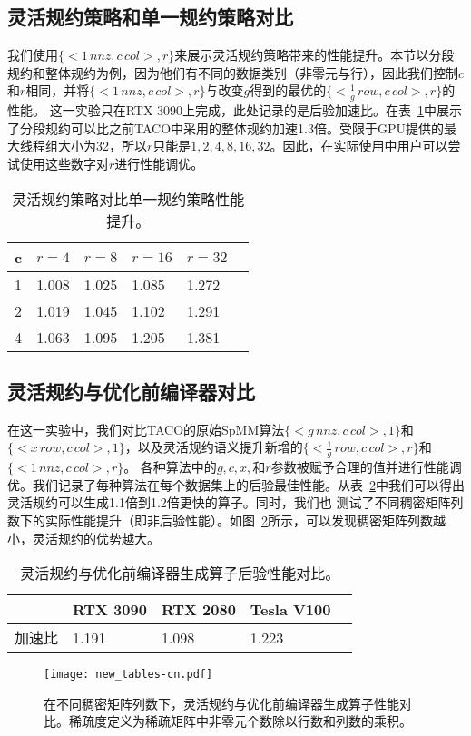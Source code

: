\subsection{灵活规约策略和单一规约策略对比}
我们使用$\{<1\,nnz , c\,col>,r\}$来展示灵活规约策略带来的性能提升。本节以分段规约和整体规约为例，因为他们有不同的数据类别（非零元与行），因此我们控制$c$和$r$相同，并将$\{<1\,nnz , c\,col>,r\}$与改变$g$得到的最优的$\{<\frac{1}{g}\,row, c\,col>,r\}$的性能。
这一实验只在RTX 3090上完成，此处记录的是后验加速比。在表~\ref{tab:comp-flexstr}中展示了分段规约可以比之前TACO中采用的整体规约加速1.3倍。受限于GPU提供的最大线程组大小为32，所以$r$只能是$1,2,4,8,16,32$。因此，在实际使用中用户可以尝试使用这些数字对$r$进行性能调优。
\begin{table}
  \centering
  \caption{灵活规约策略对比单一规约策略性能提升。}
  \begin{tabular}{llllll}
  \toprule
  c &  $r=4$  & $r=8$ & $r=16$  & $r=32$\\
  \midrule
  1   & 1.008   & 1.025  & 1.085 & 1.272 \\
  2    & 1.019   & 1.045  & 1.102 & 1.291 \\
  4   & 1.063   & 1.095  & 1.205 & 1.381 \\
  \bottomrule
  \end{tabular}
  \label{tab:comp-flexstr}
\end{table}
\subsection{灵活规约与优化前编译器对比}
在这一实验中，我们对比TACO的原始SpMM算法$\{<g\,nnz, c\,col>,1\}$和$\{<x\,row,c\,col >,1\}$，以及灵活规约语义提升新增的$\{<\frac{1}{g}\,row, c\,col>,r\}$和$\{<1\,nnz , c\,col>,r\}$。
各种算法中的$g,c,x,$和$r$参数被赋予合理的值并进行性能调优。我们记录了每种算法在每个数据集上的后验最佳性能。从表~\ref{tab:comp-all}中我们可以得出灵活规约可以生成1.1倍到1.2倍更快的算子。同时，我们也
测试了不同稠密矩阵列数下的实际性能提升（即非后验性能）。如图~\ref{tab:comp-all}所示，可以发现稠密矩阵列数越小，灵活规约的优势越大。
\begin{table}
  \centering
  \caption{灵活规约与优化前编译器生成算子后验性能对比。}
  \begin{tabular}{lllll}
  \toprule
  & RTX 3090  & RTX 2080 & Tesla V100 \\
  \midrule
  加速比   & 1.191   & 1.098  & 1.223\\
  \bottomrule
  \end{tabular}
  \label{tab:comp-all}
\end{table}
\begin{figure}[h]%
  \centering
  \texttt{[image: new\_tables-cn.pdf]}
  \caption{在不同稠密矩阵列数下，灵活规约与优化前编译器生成算子性能对比。稀疏度定义为稀疏矩阵中非零元个数除以行数和列数的乘积。}\label{fig:comp-tables}
\end{figure}
